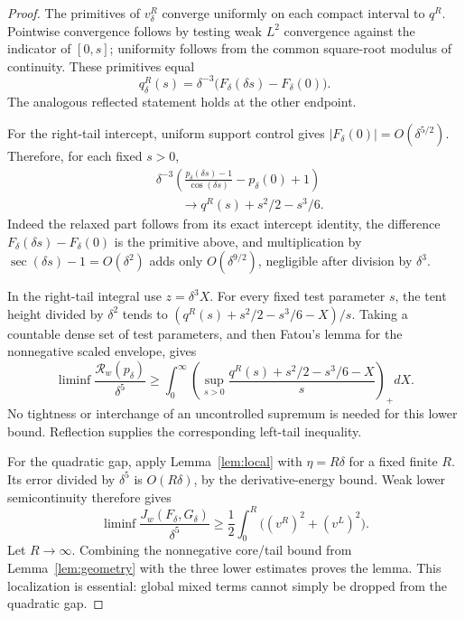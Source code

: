 \documentclass[11pt]{article}
\begin{document}
\begin{proof}
The primitives of $v_\delta^R$ converge uniformly on each compact interval to $q^R$. Pointwise convergence follows by testing weak $L^2$ convergence against the indicator of $[0,s]$; uniformity follows from the common square-root modulus of continuity. These primitives equal
\[
 q_\delta^R(s)=\delta^{-3}\bigl(F_\delta(\delta s)-F_\delta(0)\bigr).
\]
The analogous reflected statement holds at the other endpoint.

For the right-tail intercept, uniform support control gives $|F_\delta(0)|=O(\delta^{5/2})$. Therefore, for each fixed $s>0$,
\begin{align*}
 &\delta^{-3}\left(\frac{p_\delta(\delta s)-1}{\cos(\delta s)}-p_\delta(0)+1\right)\\
 &\qquad\longrightarrow q^R(s)+s^2/2-s^3/6.
\end{align*}
Indeed the relaxed part follows from its exact intercept identity, the difference $F_\delta(\delta s)-F_\delta(0)$ is the primitive above, and multiplication by $\sec(\delta s)-1=O(\delta^2)$ adds only $O(\delta^{9/2})$, negligible after division by $\delta^3$.

In the right-tail integral use $z=\delta^3X$. For every fixed test parameter $s$, the tent height divided by $\delta^2$ tends to $(q^R(s)+s^2/2-s^3/6-X)/s$. Taking a countable dense set of test parameters, and then Fatou's lemma for the nonnegative scaled envelope, gives
\[
 \liminf\frac{\mathcal R_w(p_\delta)}{\delta^5}
 \ge\int_0^\infty\left(\sup_{s>0}\frac{q^R(s)+s^2/2-s^3/6-X}{s}\right)_+dX.
\]
No tightness or interchange of an uncontrolled supremum is needed for this lower bound. Reflection supplies the corresponding left-tail inequality.

For the quadratic gap, apply Lemma~\ref{lem:local} with $\eta=R\delta$ for a fixed finite $R$. Its error divided by $\delta^5$ is $O(R\delta)$, by the derivative-energy bound. Weak lower semicontinuity therefore gives
\[
 \liminf\frac{J_w(F_\delta,G_\delta)}{\delta^5}
 \ge\frac12\int_0^R\bigl((v^R)^2+(v^L)^2\bigr).
\]
Let $R\to\infty$. Combining the nonnegative core/tail bound from Lemma~\ref{lem:geometry} with the three lower estimates proves the lemma. This localization is essential: global mixed terms cannot simply be dropped from the quadratic gap.
\end{proof}
\end{document}
